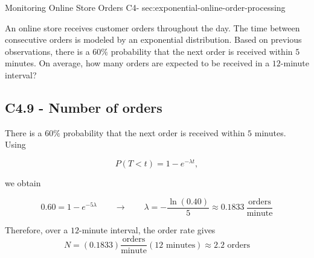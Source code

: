 	\sectionScored
	{Monitoring Online Store Orders}
	{C4-}
	{sec:exponential-online-order-processing}
	{
		An online store receives customer orders throughout the day. The time
		between consecutive orders is modeled by an exponential distribution.
		Based on previous observations, there is a \(60\%\) probability that the
		next order is received within \(5\) minutes. On average, how many orders
		are expected to be received in a \(12\)-minute interval?
		
		
		\subsection*{C4.9 - Number of orders}
		\label{subsec:c4-find-rate-orders}
		
		There is a \(60\%\) probability that the next order is received within
		\(5\) minutes. Using
		
		$$
		P(T<t)=1-e^{-\lambda t},
		$$
		
		we obtain
		
		$$
		0.60=1-e^{-5\lambda}
		\qquad \longrightarrow \qquad
		\lambda=-\frac{\ln(0.40)}{5}
		\approx0.1833\>\frac{\text{orders}}{\text{minute}}
		$$
		
		Therefore, over a \(12\)-minute interval, the order rate gives
		$$
		N=(0.1833)\frac{\text{orders}}{\text{minute}}(12\text{ minutes})
		\approx \boxed{2.2\text{ orders}}
		$$
		
		\vspace{-5mm}
	}
	
